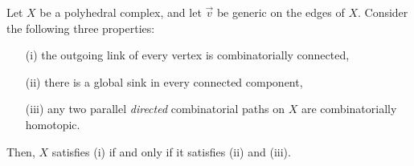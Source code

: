 \begin{proposition}
\label{l:oriented}
    Let $X$ be a polyhedral complex, and let $\vec v$ be generic on the edges of $X$. 
    Consider the following three properties:
    \begin{enumerate}
        \item[(i)] the outgoing link of every vertex is combinatorially connected,
        \item[(ii)] there is a global sink in every connected component,
        \item[(iii)] any two parallel \emph{directed} combinatorial paths on $X$ are combinatorially homotopic.
    \end{enumerate}
    Then, $X$ satisfies (i) if and only if it satisfies (ii) and (iii).
\end{proposition}

